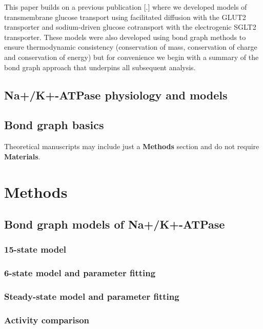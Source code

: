 \documentclass{biophys-new}
\begin{document}
This paper builds on a previous publication {[}.{]} where we developed
models of transmembrane glucose transport using facilitated diffusion
with the GLUT2 transporter and sodium-driven glucose cotransport with
the electrogenic SGLT2 transporter. These models were also developed
using bond graph methods to ensure thermodynamic consistency
(conservation of mass, conservation of charge and conservation of
energy) but for convenience we begin with a summary of the bond graph
approach that underpins all subsequent analysis.

\subsection*{Na+/K+-ATPase physiology and models}


\subsection*{Bond graph basics}

Theoretical manuscripts may include just a \textbf{Methods} section and do not require \textbf{Materials}.


\section*{Methods}


\subsection*{Bond graph models of Na+/K+-ATPase}

\subsubsection{15-state model}

\subsubsection{6-state model and parameter fitting}

\subsubsection{Steady-state model and parameter fitting}

\subsubsection{Activity comparison }
\end{document}
